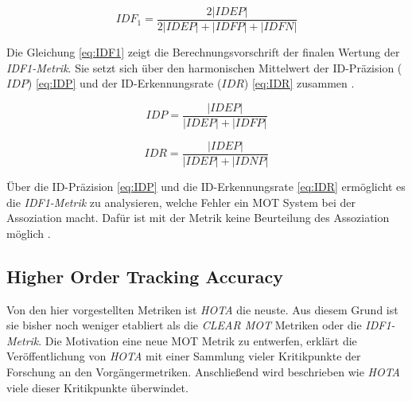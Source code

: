 \begin{equation}
    \label{eq:IDF1}
    IDF_1 = \frac{2 |IDEP|}{2 |IDEP|+|IDFP|+|IDFN|}
\end{equation}

Die Gleichung \ref{eq:IDF1} zeigt die Berechnungsvorschrift der finalen Wertung der \textit{\gls{IDF1}-Metrik}. Sie setzt sich über den harmonischen Mittelwert der ID-Präzision (\(IDP\)) \ref{eq:IDP} und der ID-Erkennungsrate (\(IDR\)) \ref{eq:IDR} zusammen \cite{IDF1, Kroschel.2011}.

\begin{equation}
    \label{eq:IDP}
    IDP = \frac{|IDEP|}{|IDEP|+|IDFP|}
\end{equation}

\begin{equation}
    \label{eq:IDR}
    IDR = \frac{|IDEP|}{|IDEP|+|IDNP|}
\end{equation}

Über die ID-Präzision \ref{eq:IDP} und die ID-Erkennungsrate \ref{eq:IDR} ermöglicht es die \textit{\gls{IDF1}-Metrik} zu analysieren, welche Fehler ein \gls{MOT} System bei der \gls{Assoziation} macht. Dafür ist mit der Metrik keine Beurteilung des \gls{Assoziation} möglich \cite{IDF1, HOTA}. 

\subsection{Higher Order Tracking Accuracy}  \label{sec:MOT HOTA}
Von den hier vorgestellten Metriken ist \textit{\gls{HOTA}} die neuste. Aus diesem Grund ist sie bisher noch weniger etabliert als die \textit{\acrshort{CLEAR} \gls{MOT}} Metriken oder die \textit{\gls{IDF1}-Metrik}. Die Motivation eine neue \gls{MOT} Metrik zu entwerfen, erklärt die Veröffentlichung von \textit{\gls{HOTA}} \cite{HOTA} mit einer Sammlung vieler Kritikpunkte der Forschung an den Vorgängermetriken. Anschließend wird beschrieben wie \textit{\gls{HOTA}} viele dieser Kritikpunkte überwindet. \par

